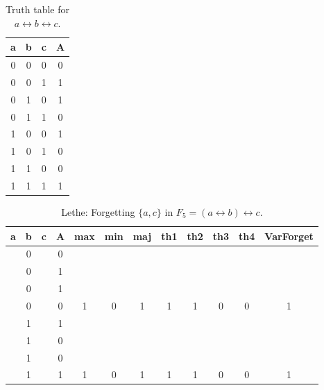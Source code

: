\begin{table}[!tb]
    \centering
    \begin{tabular}{|c|c|c|c|}
        \hline
        \textbf{a} & \textbf{b} & \textbf{c} & \textbf{A} \\ \hline
        0 & 0 & 0 & 0 \\ \hline
        0 & 0 & 1 & 1 \\ \hline
        0 & 1 & 0 & 1 \\ \hline
        0 & 1 & 1 & 0 \\ \hline
        1 & 0 & 0 & 1 \\ \hline
        1 & 0 & 1 & 0 \\ \hline
        1 & 1 & 0 & 0 \\ \hline
        1 & 1 & 1 & 1 \\ \hline
    \end{tabular}
    \caption{Truth table for $a \leftrightarrow b \leftrightarrow c$.}
    \label{tab:truthtab}
\end{table}

\begin{table}[!tb]
    \centering
    \begin{tabular}{|c|c|c|c|c|c|c|c|c|c|c|c|}
        \hline
        \textbf{a} & \textbf{b} & \textbf{c} & \textbf{A} & \textbf{max} & \textbf{min} & \textbf{maj} & \textbf{th1} & \textbf{th2} & \textbf{th3} & \textbf{th4} & \textbf{VarForget} \\ \hline
        \rowcolor{gray!40}  & 0 &  & 0 &  &  &  &  &  &  &  &  \\ \hline
        \rowcolor{gray!40}  & 0 &  & 1 &  &  &  &  &  &  &  &  \\ \hline
        \rowcolor{gray!40}  & 0 &  & 1 &  &  &  &  &  &  &  &  \\ \hline
        \rowcolor{gray!40}  & 0 &  & 0 & 1 & 0 & 1 & 1 & 1 & 0 & 0 & 1 \\ \hline
        \rowcolor{blue!40}  & 1 &  & 1 &  &  &  &  &  &  &  &  \\ \hline
        \rowcolor{blue!40}  & 1 &  & 0 &  &  &  &  &  &  &  &  \\ \hline
        \rowcolor{blue!40}  & 1 &  & 0 &  &  &  &  &  &  &  &  \\ \hline
        \rowcolor{blue!40}  & 1 &  & 1 & 1 & 0 & 1 & 1 & 1 & 0 & 0 & 1 \\ \hline
    \end{tabular}
    \caption{Lethe: Forgetting $\{a, c\}$ in $F_{5} = (a \leftrightarrow b) \leftrightarrow c$.}
    \label{tab:lethe-F5-ac}
\end{table}
